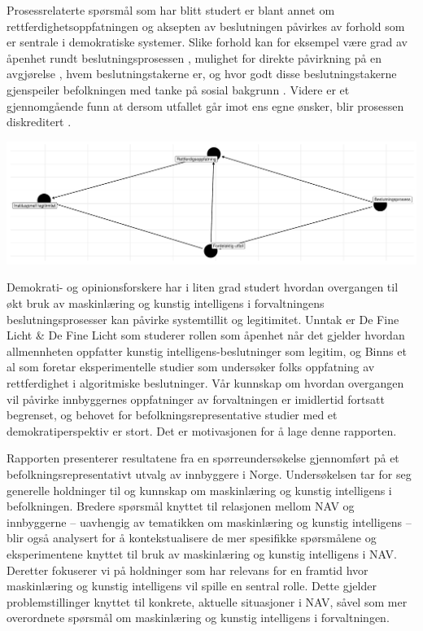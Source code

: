 \documentclass[
]{book}
\begin{document}
Prosessrelaterte spørsmål som har blitt studert er blant annet om rettferdighetsoppfatningen og aksepten av beslutningen påvirkes av forhold som er sentrale i demokratiske systemer.
Slike forhold kan for eksempel være grad av åpenhet rundt beslutningsprosessen \citep{de2014does}, mulighet for direkte påvirkning på en avgjørelse \citep{EJPR:EJPR2052, arnesen2017legitimacy, christensen2020matter}, hvem beslutningstakerne er, og hvor godt disse beslutningstakerne gjenspeiler befolkningen med tanke på sosial bakgrunn \citep{arnesen2018legitimacy, clayton2019all}.
Videre er et gjennomgående funn at dersom utfallet går imot ens egne ønsker, blir prosessen diskreditert \citep{esaiasson2016reconsidering}.

\includegraphics{NAV_files/figure-latex/dag-1.pdf}

Demokrati- og opinionsforskere har i liten grad studert hvordan overgangen til økt bruk av maskinlæring og kunstig intelligens i forvaltningens beslutningsprosesser kan påvirke systemtillit og legitimitet.
Unntak er De Fine Licht \& De Fine Licht \citeyearpar{de2020artificial} som studerer rollen som åpenhet når det gjelder hvordan allmennheten oppfatter kunstig intelligens-beslutninger som legitim, og Binns et al \citeyearpar{binns2018s} som foretar eksperimentelle studier som undersøker folks oppfatning av rettferdighet i algoritmiske beslutninger.
Vår kunnskap om hvordan overgangen vil påvirke innbyggernes oppfatninger av forvaltningen er imidlertid fortsatt begrenset, og behovet for befolkningsrepresentative studier med et demokratiperspektiv er stort.
Det er motivasjonen for å lage denne rapporten.

Rapporten presenterer resultatene fra en spørreundersøkelse gjennomført på et befolkningsrepresentativt utvalg av innbyggere i Norge.
Undersøkelsen tar for seg generelle holdninger til og kunnskap om maskinlæring og kunstig intelligens i befolkningen.
Bredere spørsmål knyttet til relasjonen mellom NAV og innbyggerne -- uavhengig av tematikken om maskinlæring og kunstig intelligens -- blir også analysert for å kontekstualisere de mer spesifikke spørsmålene og eksperimentene knyttet til bruk av maskinlæring og kunstig intelligens i NAV.
Deretter fokuserer vi på holdninger som har relevans for en framtid hvor maskinlæring og kunstig intelligens vil spille en sentral rolle.
Dette gjelder problemstillinger knyttet til konkrete, aktuelle situasjoner i NAV, såvel som mer overordnete spørsmål om maskinlæring og kunstig intelligens i forvaltningen.
\end{document}
